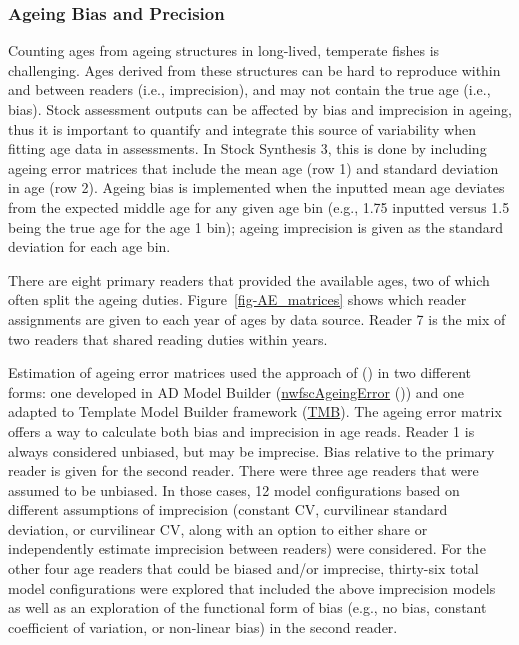 \documentclass[
]{scrartcl}
\begin{document}
\subsubsection{Ageing Bias and
Precision}\label{ageing-bias-and-precision}

Counting ages from ageing structures in long-lived, temperate fishes is
challenging. Ages derived from these structures can be hard to reproduce
within and between readers (i.e., imprecision), and may not contain the
true age (i.e., bias). Stock assessment outputs can be affected by bias
and imprecision in ageing, thus it is important to quantify and
integrate this source of variability when fitting age data in
assessments. In Stock Synthesis 3, this is done by including ageing
error matrices that include the mean age (row 1) and standard deviation
in age (row 2). Ageing bias is implemented when the inputted mean age
deviates from the expected middle age for any given age bin (e.g., 1.75
inputted versus 1.5 being the true age for the age 1 bin); ageing
imprecision is given as the standard deviation for each age bin.

There are eight primary readers that provided the available ages, two of
which often split the ageing duties. Figure~\ref{fig-AE_matrices} shows
which reader assignments are given to each year of ages by data source.
Reader 7 is the mix of two readers that shared reading duties within
years.

Estimation of ageing error matrices used the approach of
() in two different forms: one
developed in AD Model Builder
(\href{https://github.com/pfmc-assessments/nwfscAgeingError}{nwfscAgeingError}
()) and one adapted to Template Model Builder framework
(\href{https://pfmc-assessments.github.io/AgeingError/articles/getting_started.html}{TMB}).
The ageing error matrix offers a way to calculate both bias and
imprecision in age reads. Reader 1 is always considered unbiased, but
may be imprecise. Bias relative to the primary reader is given for the
second reader. There were three age readers that were assumed to be
unbiased. In those cases, 12 model configurations based on different
assumptions of imprecision (constant CV, curvilinear standard deviation,
or curvilinear CV, along with an option to either share or independently
estimate imprecision between readers) were considered. For the other
four age readers that could be biased and/or imprecise, thirty-six total
model configurations were explored that included the above imprecision
models as well as an exploration of the functional form of bias (e.g.,
no bias, constant coefficient of variation, or non-linear bias) in the
second reader.
\end{document}
